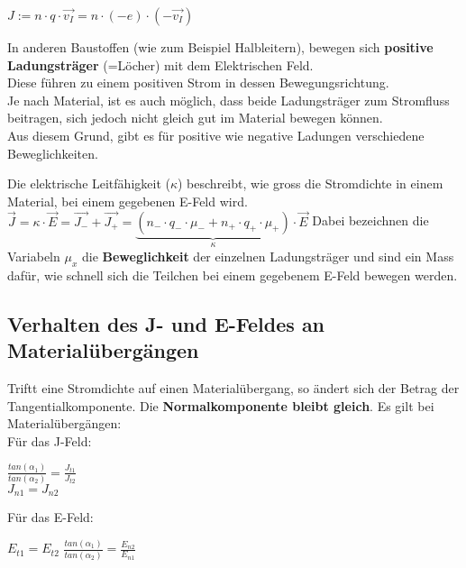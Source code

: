 \begin{center}
	$\displaystyle J := n \cdot q \cdot \vec{v_I} = n \cdot (-e) \cdot (-\vec{v_I}) $
\end{center}

In anderen Baustoffen (wie zum Beispiel Halbleitern), bewegen sich \textbf{positive Ladungsträger} (=Löcher) mit dem Elektrischen Feld. \\
Diese führen zu einem positiven Strom in dessen Bewegungsrichtung. \\
Je nach Material, ist es auch möglich, dass beide Ladungsträger zum Stromfluss beitragen, sich jedoch nicht gleich gut im Material bewegen können. \\
Aus diesem Grund, gibt es für positive wie negative Ladungen verschiedene Beweglichkeiten.

\beginip
Die elektrische Leitfähigkeit ($\kappa$) beschreibt, wie gross die Stromdichte in einem Material, bei einem gegebenen E-Feld wird. \\
\formulaBegin
$\displaystyle \vec{J} = \kappa \cdot \vec{E} = \vec{J_{-}} + \vec{J_{+}} = \underbrace{(n_{-} \cdot q_{-} \cdot \mu_- + n_+ \cdot q_+ \cdot \mu_{+})}_{\kappa} \cdot \vec{E}$
\formulaEnd
Dabei bezeichnen die Variabeln $\mu_{x}$ die \textbf{Beweglichkeit} der einzelnen Ladungsträger und sind ein Mass dafür, wie schnell sich die Teilchen bei einem gegebenem E-Feld bewegen werden.
\iend


\subsection{Verhalten des J- und E-Feldes an Materialübergängen}
Triftt eine Stromdichte auf einen Materialübergang, so ändert sich der Betrag der Tangentialkomponente. Die \textbf{Normalkomponente bleibt gleich}.
\begingl
Es gilt bei Materialübergängen: \\
Für das J-Feld:
\fspace
\formulaBegin

$\displaystyle \frac{tan(\alpha_1)}{tan(\alpha_2)} = \frac{J_{t1}}{J_{t2}}  $ \\
\fspace
$\displaystyle J_{n1} = J_{n2}$

\formulaEnd

Für das E-Feld:
\fspace
\formulaBegin

$\displaystyle E_{t1} = E_{t2}$
$\displaystyle \frac{tan(\alpha_1)}{tan(\alpha_2)} = \frac{E_{n2}}{E_{n1}}  $ \\
\fspace

\formulaEnd
\iend
